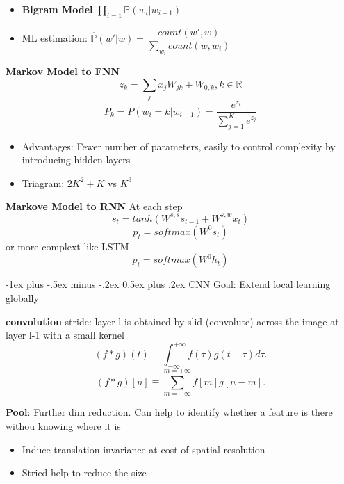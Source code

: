 \documentclass[a4paper, 10pt,landscape]{article}
\makeatletter
\renewcommand{\section}{\@startsection{section}{1}{0mm}%
                                {-1ex plus -.5ex minus -.2ex}%
                                {0.5ex plus .2ex}%
                                {\normalfont\large\bfseries}}
\makeatother
\begin{document}
\begin{multicols*}{3}
\begin{description}
\begin{itemize}
			\item {\bf Bigram Model} $\prod_{i=1} \mathbb{P}(w_i|w_{i-1})$
			\item ML estimation: $\widehat{\mathbb{P}}(w'|w) = \dfrac{count(w', w)}{\sum_{w_i} count(w, w_i)}$
		\end{itemize}
	\item {\bf Markov Model to FNN}
		$$z_k = \sum_j x_j W_{jk} + W_{0,k},   k \in \mathbb{R}$$
		$$P_k = P(w_i=k|w_{i-1}) = \dfrac{e^{z_k}}{\sum_{j=1}^K e^{z_j}}$$
		\begin{itemize}
			\item Advantages: Fewer number of parameters, easily to control complexity by introducing hidden layers
			\item Triagram: $2K^2+K$ vs $K^3$
		\end{itemize}
	\item {\bf Markove Model to RNN} At each step
		$$s_t = tanh(W^{s,s}s_{t-1} + W^{s,w}x_t)$$
		$$p_t = softmax(W^0 s_t)$$ or more complext like LSTM
		$$p_t = softmax(W^0 h_t)$$
 
\end{description}

\section{CNN}
Goal: Extend local learning globally
\begin{description}
	\item{\bf convolution} stride: layer l is obtained by slid (convolute) across the image at layer l-1 with a small kernel
		$$\left(f*g\right)(t)\equiv\int_{-\infty}^{+\infty}f(\tau)g(t-\tau)d\tau.$$
		$$\left(f*g\right)[n]\equiv\sum_{m=-\infty}^{m=+\infty}f[m]g[n-m].$$
	\item{\bf Pool}: Further dim reduction. Can help to identify whether a feature is there withou knowing where it is 
		\begin{itemize}
			\item Induce translation invariance at cost of spatial resolution
			\item Stried help to reduce the size 
		\end{itemize}
\end{description}







\end{multicols*}
\end{document}
